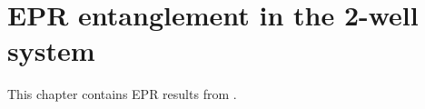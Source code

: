 \chapter{EPR entanglement in the 2-well system}
\label{cha:epr-two-well}

This chapter contains EPR results from \cite{Opanchuk2012a}.
